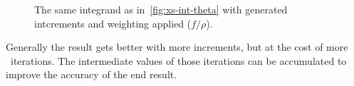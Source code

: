 \begin{figure}[ht]
  \centering {}
  \caption[\(2\pi\dv{\sigma}{\theta}\) with integration
  boundaries]{\label{fig:xs-int-vegas} The same integrand as
    in~\ref{fig:xs-int-theta} with \vegas\-generated intcrements and
    weighting applied (\(f/\rho\)).}
\end{figure}

Generally the result gets better with more increments, but at the cost
of more \vegas\ iterations. The intermediate values of those
iterations can be accumulated to improve the accuracy of the end
result.~\cite[197]{Lepage:19781an}
